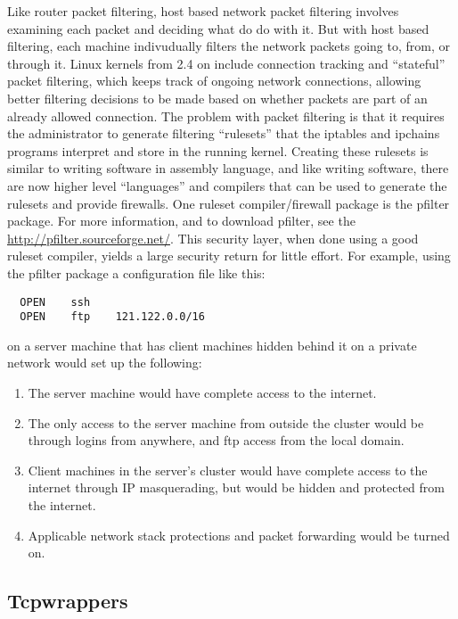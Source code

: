 Like router packet filtering, host based network packet filtering
involves examining each packet and deciding what do do with it.  But
with host based filtering, each machine indivudually filters the
network packets going to, from, or through it.  Linux kernels from 2.4
on include connection tracking and ``stateful'' packet filtering,
which keeps track of ongoing network connections, allowing better
filtering decisions to be made based on whether packets are part of an
already allowed connection. The problem with packet filtering is that
it requires the administrator to generate filtering ``rulesets'' that
the iptables and ipchains programs interpret and store in the running
kernel.  Creating these rulesets is similar to writing software in
assembly language, and like writing software, there are now higher
level ``languages'' and compilers that can be used to generate the
rulesets and provide firewalls.  One ruleset compiler/firewall package
is the pfilter package.  For more information, and to download
pfilter, see the \url{http://pfilter.sourceforge.net/}. This security
layer, when done using a good ruleset compiler, yields a large
security return for little effort.  For example, using the pfilter
package a configuration file like this:

\begin{verbatim}
  OPEN    ssh
  OPEN    ftp    121.122.0.0/16
\end{verbatim}

\noindent on a server machine that has client machines hidden behind it
on a private network would set up the following:

\begin{enumerate}
\item The server machine would have complete access to the internet.
\item The only access to the server machine from outside the cluster
  would be through  logins from anywhere, and ftp access from
  the local domain.
\item Client machines in the server's cluster would have complete
  access to the internet through IP masquerading, but would be hidden
  and protected from the internet.
\item Applicable network stack protections and packet forwarding would
  be turned on.
\end{enumerate}

\subsection{Tcpwrappers}

